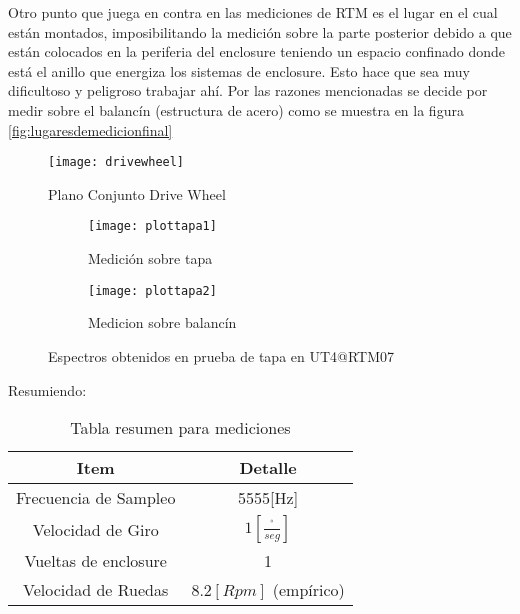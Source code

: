 	            Otro punto que juega en contra en las mediciones de RTM es el lugar en el cual están montados, imposibilitando la medición sobre la parte posterior debido a que están colocados en la periferia del enclosure teniendo un espacio confinado donde está el anillo que energiza los sistemas de enclosure. Esto hace que sea muy dificultoso y peligroso trabajar ahí. Por las razones mencionadas se decide por medir sobre el balancín (estructura de acero) como se muestra en la figura \ref{fig:lugaresdemedicionfinal}
	            \begin{figure}
	                \centering
	                \texttt{[image: drivewheel]}
	                \caption{Plano Conjunto Drive Wheel}
	                \label{fig:planodrivewheel}
	            \end{figure}
	            \begin{figure}[H]
				    \centering
				    \begin{subfigure}[b]{\textwidth}        \texttt{[image: plottapa1]}
    					\caption{Medición sobre tapa}
    					\label{fig:plottapa1}
    				\end{subfigure}			    
    			    \begin{subfigure}[b]{\textwidth}
    			    	\texttt{[image: plottapa2]}
    			    	\caption{Medicion sobre balancín}
    			    	\label{fig:plottapa2}
    			    \end{subfigure}
    		        \caption{Espectros obtenidos en prueba de tapa en UT4@RTM07}
    		        \label{fig:plottapas}
		        \end{figure}
		        
		        Resumiendo:
		        \begin{table}[H]
		            \centering
		            \caption{Tabla resumen para mediciones}
		            \begin{tabular}{|c|c|}
		                \hline
		                 Item & Detalle  \\ \hline \hline
		                 Frecuencia de Sampleo & 5555[Hz] \\ \hline
		                 Velocidad de Giro & $1\left[\frac{^\circ}{seg}\right]$ \\ \hline
		                 Vueltas de enclosure & 1 \\ \hline
		                 Velocidad de Ruedas & $8.2 [Rpm]$ (empírico) \\ \hline
		            \end{tabular}
		            \label{tab:resumenmedicion}
		        \end{table}
